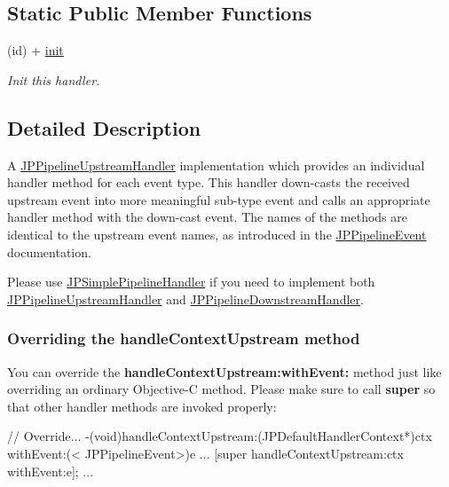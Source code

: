 \subsection*{Static Public Member Functions}
\begin{DoxyCompactItemize}
\item 
\hypertarget{a00039_aea40026cb9a22ff89738fc57510d8aa3}{
(id) + \hyperlink{a00039_aea40026cb9a22ff89738fc57510d8aa3}{init}}
\label{a00039_aea40026cb9a22ff89738fc57510d8aa3}

\begin{DoxyCompactList}\small\item\em Init this handler. \item\end{DoxyCompactList}\end{DoxyCompactItemize}


\subsection{Detailed Description}
A \hyperlink{a00035}{JPPipelineUpstreamHandler} implementation which provides an individual handler method for each event type. This handler down-\/casts the received upstream event into more meaningful sub-\/type event and calls an appropriate handler method with the down-\/cast event. The names of the methods are identical to the upstream event names, as introduced in the \hyperlink{a00023}{JPPipelineEvent} documentation.

Please use \hyperlink{a00038}{JPSimplePipelineHandler} if you need to implement both \hyperlink{a00035}{JPPipelineUpstreamHandler} and \hyperlink{a00021}{JPPipelineDownstreamHandler}.

\subsubsection*{Overriding the handleContextUpstream method}

You can override the {\bfseries handleContextUpstream:withEvent:} method just like overriding an ordinary Objective-\/C method. Please make sure to call {\bfseries super} so that other handler methods are invoked properly:


\begin{DoxyCode}
 // Override...
 -(void)handleContextUpstream:(JPDefaultHandlerContext*)ctx withEvent:(<
      JPPipelineEvent>)e {
         ...
         [super handleContextUpstream:ctx withEvent:e];
         ...
 }
\end{DoxyCode}
 

